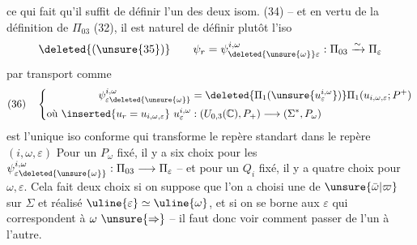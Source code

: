 ce qui fait qu'il suffit de définir l'un des deux isom. (34) -- et en vertu de la définition de $\Pi_{03}$  (32), il est naturel de définir plutôt l'iso
\[
\deleted{(\unsure{35})}\qquad\psi_r=\psi_{\deleted{\unsure{\omega}}\varepsilon}^{i,\omega}:\Pi_{03}\xrightarrow{\sim}\Pi_\varepsilon
\]
par transport  comme
\[
(36)\quad\left\{\begin{aligned}
\psi_{\varepsilon\deleted{\unsure{\omega}}}^{i,\omega}&=\deleted{\Pi_1(\unsure{u_\varepsilon^{i,\omega}})}\Pi_1(u_{i,\omega,\varepsilon};P^+)\\
\text{où }\inserted{u_r=u_{i,\omega,\varepsilon}}\ u_\varepsilon^{i,\omega}&:(U_{0,3}(\mathbb C),P_+)\longrightarrow(\Sigma^*,P_\omega)
\end{aligned}\right.
\]
est l'unique iso conforme qui transforme le repère  standart   dans le repère  $(i,\omega,\varepsilon)$
Pour un $P_\omega$ fixé, il y a six choix pour les  $\psi_{\varepsilon\deleted{\unsure{\omega}}}^{i,\omega}:\Pi_{03}\longrightarrow\Pi_\varepsilon$ -- et pour un $Q_i$ fixé, il y a quatre choix pour $\omega,\varepsilon$. Cela fait  deux choix si on suppose que l'on a choisi une  de $\unsure{\bar\omega|\varpi}$ sur $\Sigma$ et réalisé  $\uline{\varepsilon}\simeq\uline{\omega}$, et si on se borne aux $\varepsilon$ qui correspondent à $\omega\ \unsure{\Rightarrow}$ -- il faut donc voir comment passer de l'un  à l'autre.
